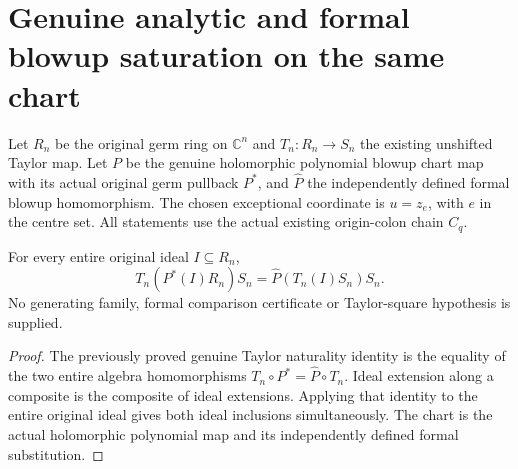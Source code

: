 \section{Genuine analytic and formal blowup saturation on the same chart}

Let $R_n$ be the original germ ring on $\mathbb C^n$ and $T_n:R_n\to S_n$
the existing unshifted Taylor map. Let $P$ be the genuine holomorphic
polynomial blowup chart map with its actual original germ pullback $P^*$,
and $\widehat P$ the independently defined formal blowup homomorphism.
The chosen exceptional coordinate is $u=z_e$, with $e$ in the centre set.
All statements use the actual existing origin-colon chain $C_q$.

\begin{theorem}
\label{hir:actual-analytic-formal-blowup-whole-total-ideal}
\leanok
For every entire original ideal $I\subseteq R_n$,
\[
 T_n(P^*(I)R_n)S_n=\widehat P(T_n(I)S_n)S_n.
\]
No generating family, formal comparison certificate or Taylor-square
hypothesis is supplied.
\end{theorem}
\begin{proof}
The previously proved genuine Taylor naturality identity is the equality
of the two entire algebra homomorphisms $T_n\circ P^*=\widehat P\circ T_n$.
Ideal extension along a composite is the composite of ideal extensions.
Applying that identity to the entire original ideal gives both ideal
inclusions simultaneously. The chart is the actual holomorphic polynomial
map and its independently defined formal substitution.
\end{proof}

